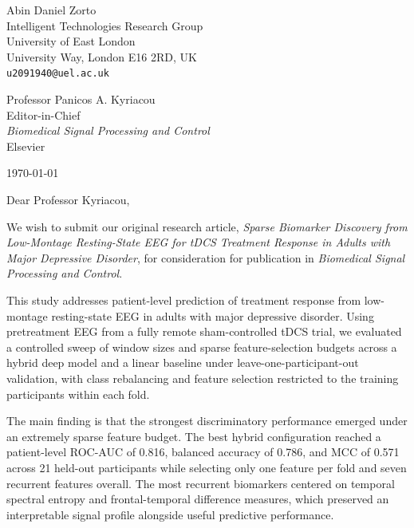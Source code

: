 \documentclass[11pt]{article}
\begin{document}
\begin{flushleft}
Abin Daniel Zorto\\
Intelligent Technologies Research Group\\
University of East London\\
University Way, London E16 2RD, UK\\
\texttt{u2091940@uel.ac.uk}
\end{flushleft}

\vspace{0.8em}

\begin{flushleft}
Professor Panicos A. Kyriacou\\
Editor-in-Chief\\
\emph{Biomedical Signal Processing and Control}\\
Elsevier
\end{flushleft}

\vspace{0.8em}

\begin{flushleft}
\today
\end{flushleft}

\vspace{0.8em}

Dear Professor Kyriacou,

We wish to submit our original research article, \emph{Sparse Biomarker Discovery from Low-Montage Resting-State EEG for tDCS Treatment Response in Adults with Major Depressive Disorder}, for consideration for publication in \emph{Biomedical Signal Processing and Control}.

This study addresses patient-level prediction of treatment response from low-montage resting-state EEG in adults with major depressive disorder. Using pretreatment EEG from a fully remote sham-controlled tDCS trial, we evaluated a controlled sweep of window sizes and sparse feature-selection budgets across a hybrid deep model and a linear baseline under leave-one-participant-out validation, with class rebalancing and feature selection restricted to the training participants within each fold.

The main finding is that the strongest discriminatory performance emerged under an extremely sparse feature budget. The best hybrid configuration reached a patient-level ROC-AUC of 0.816, balanced accuracy of 0.786, and MCC of 0.571 across 21 held-out participants while selecting only one feature per fold and seven recurrent features overall. The most recurrent biomarkers centered on temporal spectral entropy and frontal-temporal difference measures, which preserved an interpretable signal profile alongside useful predictive performance.
\end{document}
